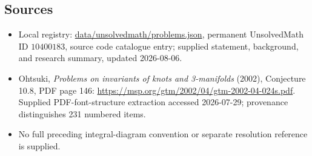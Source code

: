 \documentclass[11pt]{article}
\begin{document}
\subsection{Sources}
\begin{itemize}
\item Local registry: \url{data/unsolvedmath/problems.json}, permanent UnsolvedMath ID \(10400183\), source code catalogue entry; supplied statement, background, and research summary, updated 2026-08-06.
\item Ohtsuki, \emph{Problems on invariants of knots and 3-manifolds} (2002), Conjecture 10.8, PDF page 146: \url{https://msp.org/gtm/2002/04/gtm-2002-04-024s.pdf}. Supplied PDF-font-structure extraction accessed 2026-07-29; provenance distinguishes 231 numbered items.
\item No full preceding integral-diagram convention or separate resolution reference is supplied.
\end{itemize}
\end{document}

